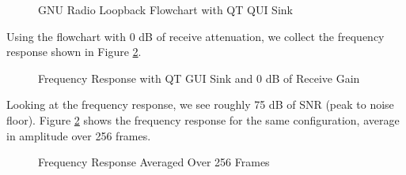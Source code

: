 \documentclass{article}
\begin{document}
\begin{figure}[H]
	\centerline{}
	\caption{GNU Radio Loopback Flowchart with QT QUI Sink}
	\label{fig::gnu_radio_loopback_flowchart_qt_gui_sink}
\end{figure}

Using the flowchart with 0 dB of receive attenuation, we collect the frequency response shown in Figure \ref{fig::gnu_radio_loopback_qt_gui_sink}.
 
\begin{figure}[H]
	\centerline{}
	\caption{Frequency Response with QT GUI Sink and 0 dB of Receive Gain}
	\label{fig::gnu_radio_loopback_qt_gui_sink}
\end{figure}

Looking at the frequency response, we see roughly 75 dB of SNR (peak to noise floor). Figure \ref{fig::gnu_radio_loopback_qt_gui_sink} shows the frequency response for the same configuration, average in amplitude over 256 frames.

\begin{figure}[H]
	\centerline{}
	\caption{Frequency Response Averaged Over 256 Frames}
	\label{fig::gnu_radio_loopback_qt_gui_sink_avg_256}
\end{figure}
\end{document}
